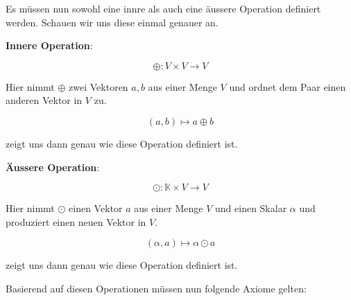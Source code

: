 \vspace{1\baselineskip}

Es müssen nun sowohl eine innre als auch eine äussere Operation definiert werden. Schauen wir uns diese einmal genauer an.

\vspace{1\baselineskip}

\textbf{Innere Operation}:

\begin{equation*}
    \oplus: V \times V \rightarrow V 
\end{equation*}

Hier nimmt \( \oplus \) zwei Vektoren \( a, b \) aus einer Menge \( V \) und ordnet dem Paar einen anderen Vektor in \( V \) zu. 

\begin{equation*}
    (a, b) \mapsto a \oplus b
\end{equation*}

zeigt uns dann genau wie diese Operation definiert ist.

\vspace{1\baselineskip}

\textbf{Äussere Operation}:

\begin{equation*}
    \odot: \mathbb{K} \times V \rightarrow V
\end{equation*}

Hier nimmt \( \odot \) einen Vektor \( a \) aus einer Menge \( V \) und einen Skalar \( \alpha \)  und produziert einen neuen Vektor in \( V \).

\begin{equation*}
    (\alpha, a) \mapsto \alpha \odot a
\end{equation*}

zeigt uns dann genau wie diese Operation definiert ist.

\vspace{1\baselineskip}

Basierend auf diesen Operationen müssen nun folgende Axiome gelten:

